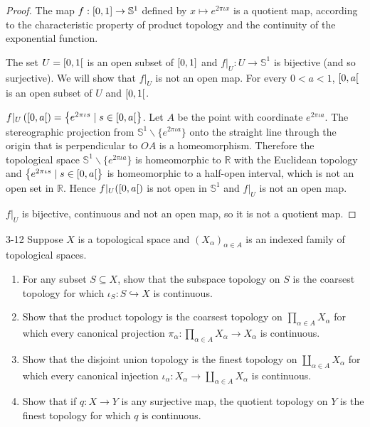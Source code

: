\begin{proof}
	The map $f: \left[{0, 1}\right] \to \mathbb{S}^{1}$ defined by $x\mapsto e^{2\pi\iota x}$ is a quotient map, according to the characteristic property of product topology and the continuity of the exponential function.

	The set $U = \left[{0, 1}\right[$ is an open subset of $\left[{0, 1}\right]$ and $f\vert_{U}: U\to \mathbb{S}^{1}$ is bijective (and so surjective). We will show that $f\vert_{U}$ is not an open map. For every $0 < a < 1$, $\left[{0, a}\right[$ is an open subset of $U$ and $\left[{0, 1}\right[$.

	$f\vert_{U}\left(\left[{0, a}\right[\right) = \left\{ e^{2\pi\iota s} \mid s\in\left[{0, a}\right[ \right\}$. Let $A$ be the point with coordinate $e^{2\pi\iota a}$. The stereographic projection from $\mathbb{S}^{1}\smallsetminus\{e^{2\pi\iota a}\}$ onto the straight line through the origin that is perpendicular to $OA$ is a homeomorphism. Therefore the topological space $\mathbb{S}^{1}\smallsetminus \{ e^{2\pi\iota a} \}$ is homeomorphic to $\mathbb{R}$ with the Euclidean topology and $\left\{ e^{2\pi\iota s} \mid s\in\left[{0, a}\right[ \right\}$ is homeomorphic to a half-open interval, which is not an open set in $\mathbb{R}$. Hence $f\vert_{U}(\left[{0, a}\right[)$ is not open in $\mathbb{S}^{1}$ and $f\vert_{U}$ is not an open map.

	$f\vert_{U}$ is bijective, continuous and not an open map, so it is not a quotient map.
\end{proof}

\begin{problem}{3-12}
Suppose $X$ is a topological space and ${(X_{\alpha})}_{\alpha\in A}$ is an indexed family of topological spaces.
\begin{enumerate}[label={(\alph*)}]
	\item For any subset $S\subseteq X$, show that the subspace topology on $S$ is the coarsest topology for which $\iota_{S}: S\hookrightarrow{}X$ is continuous.
	\item Show that the product topology is the coarsest topology on $\prod_{\alpha\in A}X_{\alpha}$ for which every canonical projection $\pi_{\alpha}: \prod_{\alpha\in A}X_{\alpha} \to X_{\alpha}$ is continuous.
	\item Show that the disjoint union topology is the finest topology on $\coprod_{\alpha\in A}X_{\alpha}$ for which every canonical injection $\iota_{\alpha}: X_{\alpha} \to \coprod_{\alpha\in A}X_{\alpha}$ is continuous.
	\item Show that if $q: X\to Y$ is any surjective map, the quotient topology on $Y$ is the finest topology for which $q$ is continuous.
\end{enumerate}
\end{problem}

